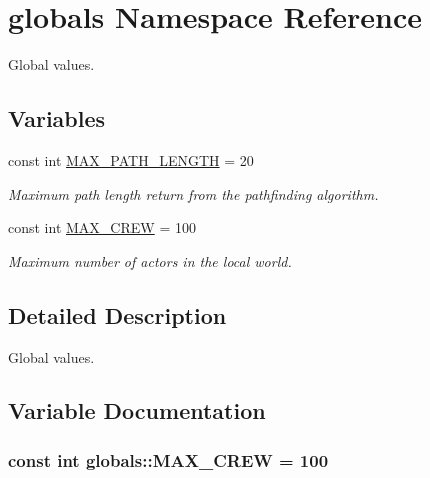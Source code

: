 \hypertarget{namespaceglobals}{\section{globals Namespace Reference}
\label{namespaceglobals}
}


Global values.  


\subsection*{Variables}
\begin{DoxyCompactItemize}
\item 
const int \hyperlink{namespaceglobals_ad06f2af5cf1c7c3b13ea34b6f0903af0}{M\-A\-X\-\_\-\-P\-A\-T\-H\-\_\-\-L\-E\-N\-G\-T\-H} = 20
\begin{DoxyCompactList}\small\item\em Maximum path length return from the pathfinding algorithm. \end{DoxyCompactList}\item 
const int \hyperlink{namespaceglobals_a3209a1ea09047e47023bbe9982b4945b}{M\-A\-X\-\_\-\-C\-R\-E\-W} = 100
\begin{DoxyCompactList}\small\item\em Maximum number of actors in the local world. \end{DoxyCompactList}\end{DoxyCompactItemize}


\subsection{Detailed Description}
Global values. 

\subsection{Variable Documentation}
\hypertarget{namespaceglobals_a3209a1ea09047e47023bbe9982b4945b}{
\subsubsection[{M\-A\-X\-\_\-\-C\-R\-E\-W}]{\setlength{\rightskip}{0pt plus 5cm}const int globals\-::\-M\-A\-X\-\_\-\-C\-R\-E\-W = 100}}\label{namespaceglobals_a3209a1ea09047e47023bbe9982b4945b}


